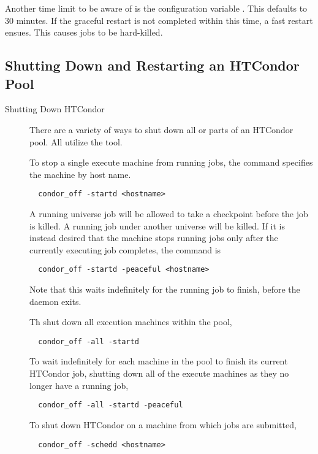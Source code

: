 Another time limit to be aware of is the configuration variable 
. 
This defaults to 30 minutes. 
If the graceful restart is not completed within this time, 
a fast restart ensues. 
This causes jobs to be hard-killed. 

\subsection{\label{sec:Pool-Shutdown-and-Restart}
Shutting Down and Restarting an HTCondor Pool}

\begin{description}
\item[Shutting Down HTCondor]
There are a variety of ways to shut down all or parts of an HTCondor pool.
All utilize the  tool.

To stop a single execute machine from running jobs,
the  command specifies the machine by host name.
\begin{verbatim}
  condor_off -startd <hostname>
\end{verbatim}
A running  universe job will be allowed to 
take a checkpoint before the job is killed.
A running job under another universe will be killed.
If it is instead desired that the machine stops running jobs
only after the currently executing job completes, the command is
\begin{verbatim}
  condor_off -startd -peaceful <hostname>
\end{verbatim}
Note that this waits indefinitely for the running job to finish,
before the  daemon exits.

Th shut down all execution machines within the pool,
\begin{verbatim}
  condor_off -all -startd
\end{verbatim}

To wait indefinitely for each machine in the pool to finish its current
HTCondor job,
shutting down all of the execute machines as they no longer
have a running job,
\begin{verbatim}
  condor_off -all -startd -peaceful
\end{verbatim}

To shut down HTCondor on a machine from which jobs are submitted,
\begin{verbatim}
  condor_off -schedd <hostname>
\end{verbatim}


\end{description}
